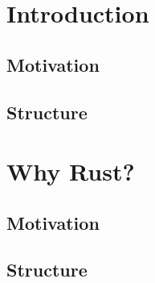 \documentclass[11pt]{report}
\begin{document}
    
    \thispagestyle{empty}\newpage

    
    \thispagestyle{empty}\newpage

    \tableofcontents\thispagestyle{empty}\newpage

    \setcounter{page}{1}
    \chapter{Introduction}
    \blindtext
    \section{Motivation}
    \blindtext

    \section{Structure}

    \chapter{Why Rust?}
    \blindtext
    \section{Motivation}
    \blindtext

    \section{Structure}

\end{document}
